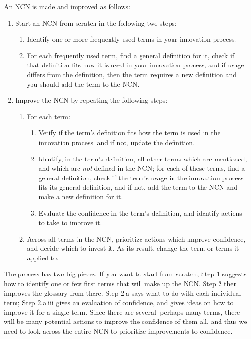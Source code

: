 \documentclass[graybox,envcountchap,sectrefs]{svmono}
\newcommand{\ncn}{NCN}
\begin{document}
An \ncn{} is made and improved as follows:
\begin{enumerate}
    \item Start an \ncn{} from scratch in the following two steps:
        \begin{enumerate}
                \item Identify one or more frequently used terms in your innovation process.
                \item For each frequently used term, find a general definition for it, check if that definition fits how it is used in your innovation process, and if usage differs from the definition, then the term requires a new definition and you should add the term to the \ncn.
        \end{enumerate}
    \item Improve the \ncn{} by repeating the following steps: 
        \begin{enumerate}
            \item For each term:
                \begin{enumerate} 
                    \item Verify if the term's definition fits how the term is used in the innovation process, and if not, update the definition.
                    \item Identify, in the term's definition, all other terms which are mentioned, and which are \textit{not} defined in the \ncn; for each of these terms, find a general definition, check if the term's usage in the innovation process fits its general definition, and if not, add the term to the \ncn{} and make a new definition for it.
                    \item Evaluate the confidence in the term's definition, and identify actions to take to improve it.
                \end{enumerate}
            \item Across all terms in the \ncn, prioritize actions which improve confidence, and decide which to invest it. As its result, change the term or terms it applied to.
        \end{enumerate}
\end{enumerate}

The process has two big pieces. If you want to start from scratch, Step 1 suggests how to identify one or few first terms that will make up the \ncn. Step 2 then improves the glossary from there. Step 2.a says what to do with each individual term; Step 2.a.iii gives an evaluation of confidence, and gives ideas on how to improve it for a single term. Since there are several, perhaps many terms, there will be many potential actions to improve the confidence of them all, and thus we need to look across the entire \ncn{} to prioritize improvements to confidence.
\end{document}
